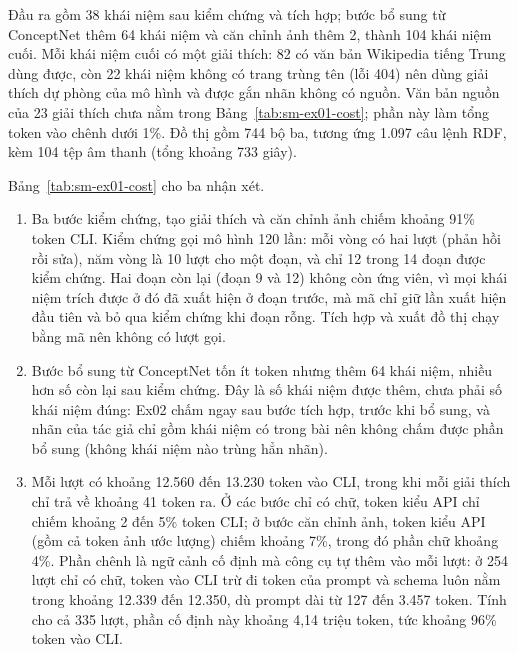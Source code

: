 Đầu ra gồm 38 khái niệm sau kiểm chứng và tích hợp; bước bổ sung từ ConceptNet thêm 64 khái niệm và căn chỉnh ảnh thêm 2, thành 104 khái niệm cuối.
Mỗi khái niệm cuối có một giải thích: 82 có văn bản Wikipedia tiếng Trung dùng được, còn 22 khái niệm không có trang trùng tên (lỗi 404) nên dùng giải thích dự phòng của mô hình và được gắn nhãn không có nguồn.
Văn bản nguồn của 23 giải thích chưa nằm trong Bảng~\ref{tab:sm-ex01-cost}; phần này làm tổng token vào chênh dưới 1\%.
Đồ thị gồm 744 bộ ba, tương ứng 1.097 câu lệnh RDF, kèm 104 tệp âm thanh (tổng khoảng 733 giây).

Bảng~\ref{tab:sm-ex01-cost} cho ba nhận xét.
\begin{enumerate}
\item Ba bước kiểm chứng, tạo giải thích và căn chỉnh ảnh chiếm khoảng 91\% token CLI. Kiểm chứng gọi mô hình 120 lần: mỗi vòng có hai lượt (phản hồi rồi sửa), năm vòng là 10 lượt cho một đoạn, và chỉ 12 trong 14 đoạn được kiểm chứng. Hai đoạn còn lại (đoạn 9 và 12) không còn ứng viên, vì mọi khái niệm trích được ở đó đã xuất hiện ở đoạn trước, mà mã chỉ giữ lần xuất hiện đầu tiên và bỏ qua kiểm chứng khi đoạn rỗng. Tích hợp và xuất đồ thị chạy bằng mã nên không có lượt gọi.
\item Bước bổ sung từ ConceptNet tốn ít token nhưng thêm 64 khái niệm, nhiều hơn số còn lại sau kiểm chứng. Đây là số khái niệm được thêm, chưa phải số khái niệm đúng: Ex02 chấm ngay sau bước tích hợp, trước khi bổ sung, và nhãn của tác giả chỉ gồm khái niệm có trong bài nên không chấm được phần bổ sung (không khái niệm nào trùng hẳn nhãn).
\item Mỗi lượt có khoảng 12.560 đến 13.230 token vào CLI, trong khi mỗi giải thích chỉ trả về khoảng 41 token ra. Ở các bước chỉ có chữ, token kiểu API chỉ chiếm khoảng 2 đến 5\% token CLI; ở bước căn chỉnh ảnh, token kiểu API (gồm cả token ảnh ước lượng) chiếm khoảng 7\%, trong đó phần chữ khoảng 4\%. Phần chênh là ngữ cảnh cố định mà công cụ tự thêm vào mỗi lượt: ở 254 lượt chỉ có chữ, token vào CLI trừ đi token của prompt và schema luôn nằm trong khoảng 12.339 đến 12.350, dù prompt dài từ 127 đến 3.457 token. Tính cho cả 335 lượt, phần cố định này khoảng 4,14 triệu token, tức khoảng 96\% token vào CLI.
\end{enumerate}

